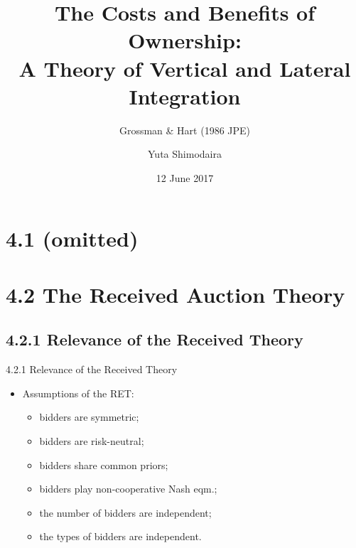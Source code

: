 \documentclass[uplatex,14pt,dvipdfmx,xcolor=svgnames]{beamer}
\title[Grossman \& Hart (1986)]{The Costs and Benefits of Ownership: \\ A Theory of Vertical and Lateral Integration}
\subtitle{Grossman \& Hart (1986 JPE)}
\author[Shimodaira, Y.]{Yuta Shimodaira}
\institute[]{}
\date{12 June 2017}
\begin{document}
\begin{frame}[c]
	
\maketitle
	
\end{frame}


\begin{frame}[t]
	
	\tableofcontents
	
\end{frame}



\section{4.1 (omitted)}

\newcommand{\secII}{4.2 The Received Auction Theory}
\section{\secII}
\newcommand{\ssecIIa}{4.2.1 Relevance of the Received Theory}
\subsection{\ssecIIa}
\begin{frame}[t]{\ssecIIa}
	
\begin{itemize}
	\item Assumptions of the RET:
	\begin{itemize}
		\item bidders are symmetric;
		\item bidders are risk-neutral;
		\item bidders share common priors;
		\item bidders play non-cooperative Nash eqm.;
		\item the number of bidders are independent;
		\item the types of bidders are independent.
	\end{itemize}
\end{itemize}
	
\end{frame}
\end{document}
